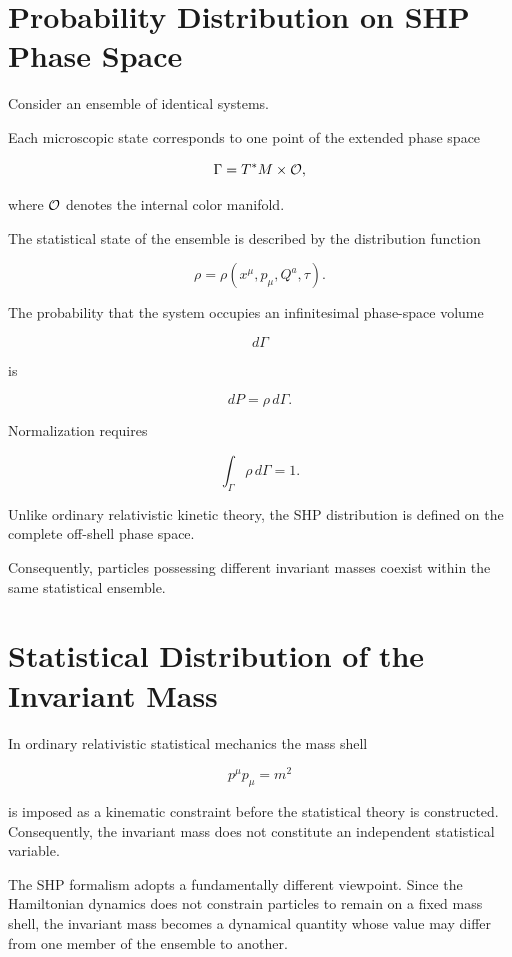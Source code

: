 \section{Probability Distribution on SHP Phase Space}

Consider an ensemble of identical systems.

Each microscopic state corresponds to one point of the extended phase
space

\[
\Gamma
=
T^*M
\times
{\cal O},
\]

where \({\cal O}\) denotes the internal color manifold.

The statistical state of the ensemble is described by the distribution
function

\[
\boxed{
\rho
=
\rho(x^\mu,p_\mu,Q^a,\tau).
}
\]

The probability that the system occupies an infinitesimal phase-space
volume

\[
d\Gamma
\]

is

\[
dP
=
\rho\,d\Gamma.
\]

Normalization requires

\[
\boxed{
\int_\Gamma
\rho
\,d\Gamma
=
1.
}
\]

Unlike ordinary relativistic kinetic theory, the SHP distribution is
defined on the complete off-shell phase space.

Consequently, particles possessing different invariant masses coexist
within the same statistical ensemble.


\section{Statistical Distribution of the Invariant Mass}

In ordinary relativistic statistical mechanics the mass shell

\[
p^\mu p_\mu = m^2
\]

is imposed as a kinematic constraint before the statistical theory is
constructed. Consequently, the invariant mass does not constitute an
independent statistical variable.

The SHP formalism adopts a fundamentally different viewpoint. Since the
Hamiltonian dynamics does not constrain particles to remain on a fixed
mass shell, the invariant mass becomes a dynamical quantity whose value
may differ from one member of the ensemble to another.

